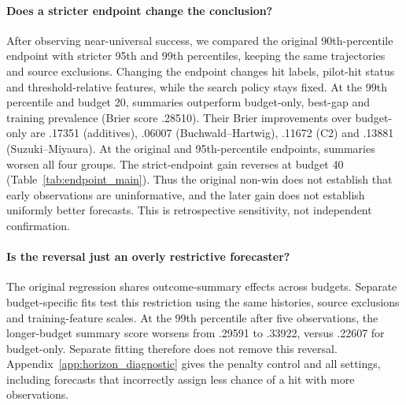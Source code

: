 \paragraph{Does a stricter endpoint change the conclusion?}
After observing near-universal success, we compared the original 90th-percentile endpoint with stricter 95th and 99th percentiles, keeping the same trajectories and source exclusions. Changing the endpoint changes hit labels, pilot-hit status and threshold-relative features, while the search policy stays fixed. At the 99th percentile and budget 20, summaries outperform budget-only, best-gap and training prevalence (Brier score .28510). Their Brier improvements over budget-only are .17351 (additives), .06007 (Buchwald--Hartwig), .11672 (C2) and .13881 (Suzuki--Miyaura). At the original and 95th-percentile endpoints, summaries worsen all four groups. The strict-endpoint gain reverses at budget 40 (Table~\ref{tab:endpoint_main}). Thus the original non-win does not establish that early observations are uninformative, and the later gain does not establish uniformly better forecasts. This is retrospective sensitivity, not independent confirmation.

\begin{table}[htbp]\centering\small
\caption{Same 550 histories, all three hindsight endpoints and both forecast budgets after five pilot observations. Brier scores: lower is better; hit rates and errors weight tables within sources, then the four sources equally. Best gap adds the best observed threshold-relative outcome to budget-only. The 99th-percentile gain reverses at budget 40.}
\label{tab:endpoint_main}

\end{table}

\paragraph{Is the reversal just an overly restrictive forecaster?}
The original regression shares outcome-summary effects across budgets. Separate budget-specific fits test this restriction using the same histories, source exclusions and training-feature scales. At the 99th percentile after five observations, the longer-budget summary score worsens from .29591 to .33922, versus .22607 for budget-only. Separate fitting therefore does not remove this reversal. Appendix~\ref{app:horizon_diagnostic} gives the penalty control and all settings, including forecasts that incorrectly assign less chance of a hit with more observations.


